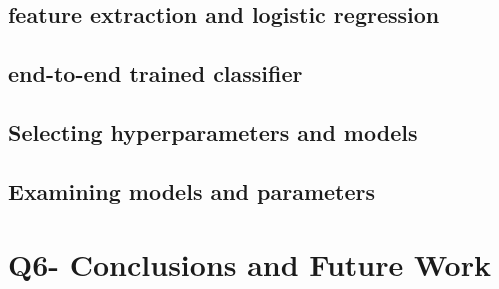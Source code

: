 \documentclass[a4paper,11pt]{article}
\begin{document}
\subsection{feature extraction and logistic regression}
\subsection{end-to-end trained classifier}
\subsection{Selecting hyperparameters and models}
\subsection{Examining models and parameters}


\section{Q6- Conclusions and Future Work}
\end{document}
